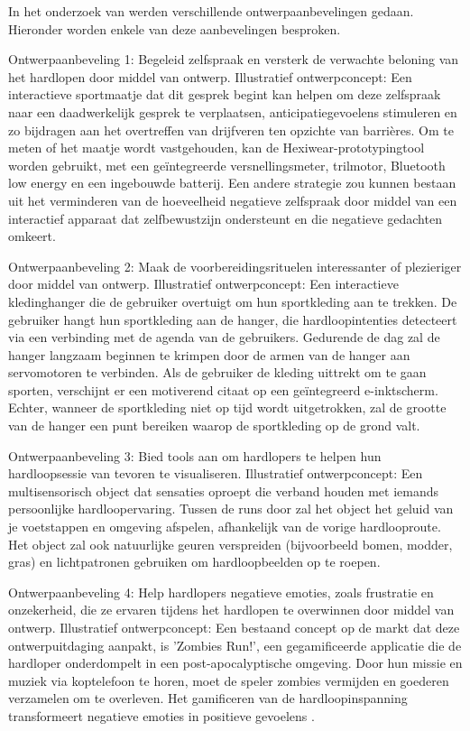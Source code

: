     In het onderzoek van \textcite{Menheere2020} werden verschillende ontwerpaanbevelingen gedaan. Hieronder worden enkele van deze aanbevelingen besproken.

    Ontwerpaanbeveling 1: Begeleid zelfspraak en versterk de verwachte beloning van het hardlopen door middel van ontwerp. 
    Illustratief ontwerpconcept: Een interactieve sportmaatje dat dit gesprek begint kan helpen om deze zelfspraak naar een daadwerkelijk gesprek te verplaatsen, 
    anticipatiegevoelens stimuleren en zo bijdragen aan het overtreffen van drijfveren ten opzichte van barrières. 
    Om te meten of het maatje wordt vastgehouden, kan de Hexiwear-prototypingtool worden gebruikt, met een geïntegreerde versnellingsmeter, 
    trilmotor, Bluetooth low energy en een ingebouwde batterij. Een andere strategie zou kunnen bestaan uit het verminderen van de hoeveelheid 
    negatieve zelfspraak door middel van een interactief apparaat dat zelfbewustzijn ondersteunt en die negatieve gedachten omkeert.

    Ontwerpaanbeveling 2: Maak de voorbereidingsrituelen interessanter of plezieriger door middel van ontwerp. 
    Illustratief ontwerpconcept: Een interactieve kledinghanger die de gebruiker overtuigt om hun sportkleding aan te trekken. 
    De gebruiker hangt hun sportkleding aan de hanger, die hardloopintenties detecteert via een verbinding met de agenda van de gebruikers. 
    Gedurende de dag zal de hanger langzaam beginnen te krimpen door de armen van de hanger aan servomotoren te verbinden. 
    Als de gebruiker de kleding uittrekt om te gaan sporten, verschijnt er een motiverend citaat op een geïntegreerd e-inktscherm. 
    Echter, wanneer de sportkleding niet op tijd wordt uitgetrokken, zal de grootte van de hanger een punt bereiken waarop de sportkleding op de grond valt.

    Ontwerpaanbeveling 3: Bied tools aan om hardlopers te helpen hun hardloopsessie van tevoren te visualiseren. 
    Illustratief ontwerpconcept: Een multisensorisch object dat sensaties oproept die verband houden met iemands persoonlijke hardloopervaring. 
    Tussen de runs door zal het object het geluid van je voetstappen en omgeving afspelen, afhankelijk van de vorige hardlooproute. 
    Het object zal ook natuurlijke geuren verspreiden (bijvoorbeeld bomen, modder, gras) en lichtpatronen gebruiken om hardloopbeelden op te roepen.

    Ontwerpaanbeveling 4: Help hardlopers negatieve emoties, zoals frustratie en onzekerheid, die ze ervaren tijdens het hardlopen te overwinnen 
    door middel van ontwerp. 
    Illustratief ontwerpconcept: Een bestaand concept op de markt dat deze ontwerpuitdaging aanpakt, is 'Zombies Run!', 
    een gegamificeerde applicatie die de hardloper onderdompelt in een post-apocalyptische omgeving. 
    Door hun missie en muziek via koptelefoon te horen, moet de speler zombies vermijden en goederen verzamelen om te overleven. 
    Het gamificeren van de hardloopinspanning transformeert negatieve emoties in positieve gevoelens \autocite{Menheere2020}.

